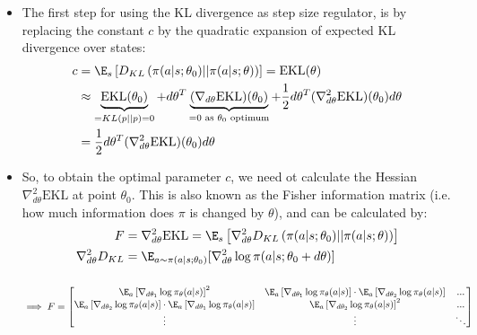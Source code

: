 \begin{itemize}
	\item The first step for using the KL divergence as step size regulator, is by replacing the constant $c$ by the quadratic expansion of expected KL divergence over states:
	\begin{equation*}
		\begin{split}
			c & = \E_{s}\left[D_{KL}\left(\pi(a|s;\theta_0)||\pi(a|s;\theta)\right)\right] = \text{EKL}(\theta)\\
			& \approx \underbrace{\text{EKL}(\theta_0)}_{=KL(p||p)=0} + d\theta^T \underbrace{(\nabla_{d\theta}\text{EKL})(\theta_0)}_{=0 \text{ as }\theta_0\text{ optimum}} + \frac{1}{2}d\theta^T (\nabla_{d\theta}^2\text{EKL})(\theta_0)d\theta\\
			& = \frac{1}{2}d\theta^T (\nabla_{d\theta}^2\text{EKL})(\theta_0)d\theta\\
		\end{split}
	\end{equation*}
	\item So, to obtain the optimal parameter $c$, we need ot calculate the Hessian $\nabla_{d\theta}^2\text{EKL}$ at point $\theta_0$. This is also known as the Fisher information matrix (i.e. how much information does $\pi$ is changed by $\theta$), and can be calculated by:
	\begin{equation*}
		\begin{split}
			F & = \nabla_{d\theta}^2\text{EKL} = \E_{s}\left[\nabla_{d\theta}^2 D_{KL}\left(\pi(a|s;\theta_0)||\pi(a|s;\theta)\right)\right]\\
			\nabla_{d\theta}^2 D_{KL} & = \E_{a\sim\pi(a|s;\theta_0)}[\nabla_{d\theta}^2 \log \pi(a|s;\theta_0+d\theta)]\\[10pt]
		\end{split}
	\end{equation*}
	$$\implies F = \begin{bmatrix}
	\E_a\left[\nabla_{d\theta_1} \log \pi_{\theta}(a|s)\right]^2 & \E_a\left[\nabla_{d\theta_1} \log \pi_{\theta}(a|s)\right]\cdot \E_a\left[\nabla_{d\theta_2} \log \pi_{\theta}(a|s)\right] & ...\\
	\E_a\left[\nabla_{d\theta_2} \log \pi_{\theta}(a|s)\right]\cdot \E_a\left[\nabla_{d\theta_1} \log \pi_{\theta}(a|s)\right] & \E_a\left[\nabla_{d\theta_2} \log \pi_{\theta}(a|s)\right]^2 & ...\\
	\vdots & \vdots & \ddots
	\end{bmatrix}$$
	

\end{itemize}
